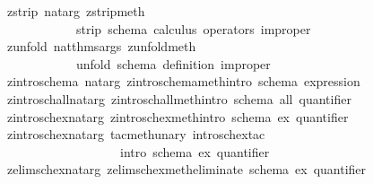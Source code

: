 \begin{isabellebody}
\ \ {\isacharparenleft}{\isachardoublequote}zstrip{\isachardoublequote}{\isacharcomma}\ nat{\isacharunderscore}arg\ zstrip{\isacharunderscore}meth{\isacharcomma}\ \isanewline
\ \ \ \ \ \ \ \ \ \ \ \ \ {\isachardoublequote}strip\ schema\ calculus\ operators\ {\isacharparenleft}improper{\isacharparenright}{\isachardoublequote}{\isacharparenright}{\isacharcomma}\isanewline
\ \ {\isacharparenleft}{\isachardoublequote}zunfold{\isachardoublequote}{\isacharcomma}\ nat{\isacharunderscore}thms{\isacharunderscore}args\ zunfold{\isacharunderscore}meth{\isacharcomma}\ \isanewline
\ \ \ \ \ \ \ \ \ \ \ \ \ {\isachardoublequote}unfold\ schema\ definition\ {\isacharparenleft}improper{\isacharparenright}{\isachardoublequote}{\isacharparenright}{\isacharcomma}\isanewline
\ \ {\isacharparenleft}{\isachardoublequote}zintro{\isacharunderscore}schema{\isachardoublequote}{\isacharcomma}\ nat{\isacharunderscore}arg\ zintro{\isacharunderscore}schema{\isacharunderscore}meth{\isacharcomma}{\isachardoublequote}intro\ schema\ expression{\isachardoublequote}{\isacharparenright}{\isacharcomma}\isanewline
\ \ {\isacharparenleft}{\isachardoublequote}zintro{\isacharunderscore}sch{\isacharunderscore}all{\isachardoublequote}{\isacharcomma}nat{\isacharunderscore}arg\ zintro{\isacharunderscore}sch{\isacharunderscore}all{\isacharunderscore}meth{\isacharcomma}{\isachardoublequote}intro\ schema\ all\ quantifier{\isachardoublequote}{\isacharparenright}{\isacharcomma}\isanewline
\ \ {\isacharparenleft}{\isachardoublequote}zintro{\isacharunderscore}sch{\isacharunderscore}ex{\isachardoublequote}{\isacharcomma}nat{\isacharunderscore}arg\ zintro{\isacharunderscore}sch{\isacharunderscore}ex{\isacharunderscore}meth{\isacharcomma}{\isachardoublequote}intro\ schema\ ex\ quantifier{\isachardoublequote}{\isacharparenright}{\isacharcomma}\isanewline
\ \ {\isacharparenleft}{\isachardoublequote}zintro{\isacharunderscore}sch{\isacharunderscore}ex{}{\isachardoublequote}{\isacharcomma}nat{\isacharunderscore}arg\ {\isacharparenleft}tac{}meth{\isacharunderscore}unary\ intro{\isacharunderscore}sch{\isacharunderscore}ex{}{\isacharunderscore}tac{\isacharparenright}{\isacharcomma}\isanewline
\ \ \ \ \ \ \ \ \ \ \ \ \ \ \ \ \ \ \ \ {\isachardoublequote}intro\ schema\ ex{}\ quantifier{\isachardoublequote}{\isacharparenright}{\isacharcomma}\isanewline
\ \ {\isacharparenleft}{\isachardoublequote}zelim{\isacharunderscore}sch{\isacharunderscore}ex{\isachardoublequote}{\isacharcomma}nat{\isacharunderscore}arg\ zelim{\isacharunderscore}sch{\isacharunderscore}ex{\isacharunderscore}meth{\isacharcomma}{\isachardoublequote}eliminate\ schema\ ex\ quantifier{\isachardoublequote}{\isacharparenright}{\isacharcomma}\isanewline

\end{isabellebody}

